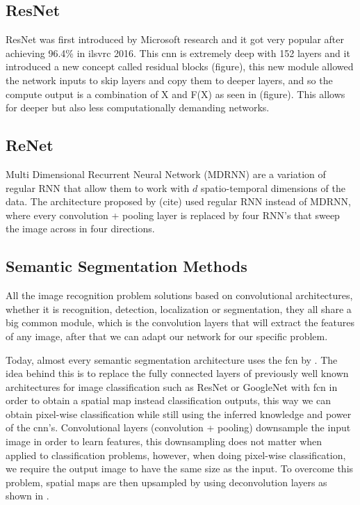 \subsection{ResNet}
ResNet was first introduced by Microsoft research and it got very popular after achieving 96.4\% in \gls{ilsvrc} 2016. This \gls{cnn} is extremely deep with 152 layers and it introduced a new concept called residual blocks (figure), this new module allowed the network inputs to skip layers and copy them to deeper layers, and so the compute output is a combination of X and F(X) as seen in (figure). This allows for deeper but also less computationally demanding networks.

\subsection{ReNet}
Multi Dimensional Recurrent Neural Network (MDRNN) are a variation of regular RNN that allow them to work with $d$ spatio-temporal dimensions of the data. The architecture proposed by (cite) used regular RNN instead of MDRNN, where every convolution + pooling layer is replaced by four RNN's that sweep the image across in four directions. 

\subsection{Semantic Segmentation Methods}
All the image recognition problem solutions based on convolutional architectures, whether it is recognition, detection, localization or segmentation, they all share a big common module, which is the convolution layers that will extract the features of any image, after that we can adapt our network for our specific problem.

Today, almost every semantic segmentation architecture uses the \gls{fcn} by \cite{DBLP:journals/corr/LongSD14}. The idea behind this is to replace the fully connected layers of previously well known architectures for image classification such as ResNet or GoogleNet with \gls{fcn} in order to obtain a spatial map instead classification outputs, this way we can obtain pixel-wise classification while still using the inferred knowledge and power of the \gls{cnn}'s. Convolutional layers (convolution + pooling) downsample the input image in order to learn features, this downsampling does not matter when applied to classification problems, however, when doing pixel-wise classification, we require the output image to have the same size as the input. To overcome this problem, spatial maps are then upsampled by using deconvolution layers as shown in \cite{deconvolution}.

